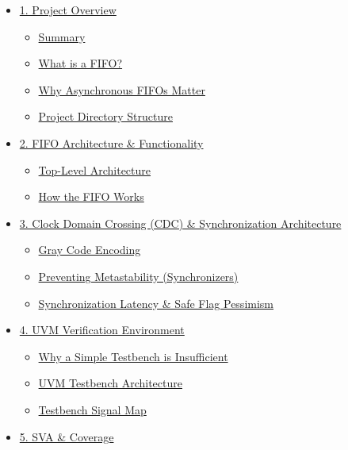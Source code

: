 \documentclass[
]{article}
\providecommand{\tightlist}{%
  \setlength{\itemsep}{0pt}\setlength{\parskip}{0pt}}
\begin{document}
\begin{itemize}
\tightlist
\item
  \hyperref[1-project-overview]{1. Project Overview}

  \begin{itemize}
  \tightlist
  \item
    \hyperref[summary]{Summary}
  \item
    \hyperref[what-is-a-fifo]{What is a FIFO?}
  \item
    \hyperref[why-asynchronous-fifos-matter]{Why Asynchronous FIFOs
    Matter}
  \item
    \hyperref[project-directory-structure]{Project Directory Structure}
  \end{itemize}
\item
  \hyperref[2-fifo-architecture--functionality]{2. FIFO Architecture \&
  Functionality}

  \begin{itemize}
  \tightlist
  \item
    \hyperref[top-level-architecture]{Top-Level Architecture}
  \item
    \hyperref[how-the-fifo-works]{How the FIFO Works}
  \end{itemize}
\item
  \hyperref[3-clock-domain-crossing-cdc--synchronization-architecture]{3.
  Clock Domain Crossing (CDC) \& Synchronization Architecture}

  \begin{itemize}
  \tightlist
  \item
    \hyperref[31-gray-code-encoding]{Gray Code Encoding}
  \item
    \hyperref[32-preventing-metastability-synchronizers]{Preventing
    Metastability (Synchronizers)}
  \item
    \hyperref[33-synchronization-latency--safe-flag-pessimism]{Synchronization
    Latency \& Safe Flag Pessimism}
  \end{itemize}
\item
  \hyperref[4-uvm-verification-environment]{4. UVM Verification
  Environment}

  \begin{itemize}
  \tightlist
  \item
    \hyperref[why-a-simple-testbench-is-insufficient]{Why a Simple
    Testbench is Insufficient}
  \item
    \hyperref[uvm-testbench-architecture]{UVM Testbench Architecture}
  \item
    \hyperref[testbench-signal-map]{Testbench Signal Map}
  \end{itemize}
\item
  \hyperref[5-sva--coverage]{5. SVA \& Coverage}


\end{itemize}
\end{document}
